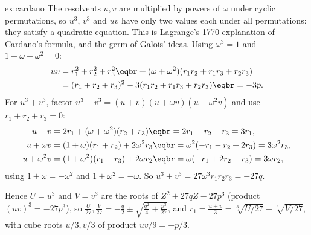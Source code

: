 \begin{solution}{ex:cardano}
\idea The resolvents $u,v$ are multiplied by powers of $\omega$ under cyclic permutations, so $u^3$, $v^3$ and $uv$ have only two values each under all permutations: they satisfy a quadratic equation. This is Lagrange's 1770 explanation of Cardano's formula, and the germ of Galois' ideas.
\writeup Using $\omega^3=1$ and $1+\omega+\omega^2=0$:
\[
\begin{aligned}
uv&=r_1^2+r_2^2+r_3^2\eqbr+(\omega+\omega^2)(r_1r_2+r_1r_3+r_2r_3)\\
&=(r_1+r_2+r_3)^2-3(r_1r_2+r_1r_3+r_2r_3)\eqbr=-3p.
\end{aligned}
\]
For $u^3+v^3$, factor $u^3+v^3=(u+v)(u+\omega v)(u+\omega^2v)$ and use $r_1+r_2+r_3=0$:
\[
\begin{aligned}
u+v&=2r_1+(\omega+\omega^2)(r_2+r_3)\eqbr=2r_1-r_2-r_3=3r_1,\\
u+\omega v&=(1+\omega)(r_1+r_2)+2\omega^2r_3\eqbr=\omega^2(-r_1-r_2+2r_3)=3\omega^2r_3,\\
u+\omega^2v&=(1+\omega^2)(r_1+r_3)+2\omega r_2\eqbr=\omega(-r_1+2r_2-r_3)=3\omega r_2,
\end{aligned}
\]
using $1+\omega=-\omega^2$ and $1+\omega^2=-\omega$. So $u^3+v^3=27\omega^3r_1r_2r_3=-27q$.

Hence $U=u^3$ and $V=v^3$ are the roots of $Z^2+27qZ-27p^3$ (product $(uv)^3=-27p^3$), so $\frac U{27},\frac V{27}=-\frac q2\pm\sqrt{\frac{q^2}4+\frac{p^3}{27}}$, and $r_1=\frac{u+v}3=\sqrt[3]{U/27}+\sqrt[3]{V/27}$, with cube roots $u/3,v/3$ of product $uv/9=-p/3$.
\end{solution}

